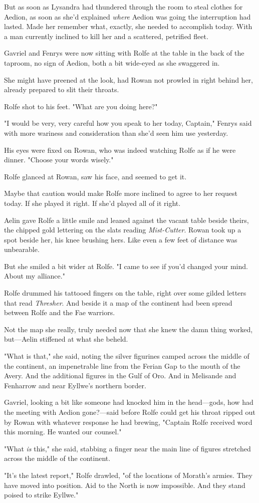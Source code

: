 But as soon as Lysandra had thundered through the room to steal clothes for Aedion, as soon as she'd explained \emph{where} Aedion was going
 the interruption had lasted. Made her remember what, exactly, she needed to accomplish today. With a man currently inclined to kill her and a scattered, petrified fleet.

Gavriel and Fenrys were now sitting with Rolfe at the table in the back of the taproom, no sign of Aedion, both a bit wide-eyed as she swaggered in.

She might have preened at the look, had Rowan not prowled in right behind her, already prepared to slit their throats.

Rolfe shot to his feet. "What are you doing here?"

"I would be very, very careful how you speak to her today, Captain," Fenrys said with more wariness and consideration than she'd seen him use yesterday.

His eyes were fixed on Rowan, who was indeed watching Rolfe as if he were dinner. "Choose your words wisely."

Rolfe glanced at Rowan, saw his face, and seemed to get it.

Maybe that caution would make Rolfe more inclined to agree to her request today. If she played it right. If she'd played all of it right.

Aelin gave Rolfe a little smile and leaned against the vacant table beside theirs, the chipped gold lettering on the slats reading
\emph{Mist-Cutter}. Rowan took up a spot beside her, his knee brushing hers. Like even a few feet of distance was unbearable.

But she smiled a bit wider at Rolfe. "I came to see if you'd changed your mind. About my alliance."

Rolfe drummed his tattooed fingers on the table, right over some gilded letters that read \emph{Thresher}. And beside it  a map of the continent had been spread between Rolfe and the Fae warriors.

Not the map she really, truly needed now that she knew the damn thing worked, but---Aelin stiffened at what she beheld.

"What is that," she said, noting the silver figurines camped across the middle of the continent, an impenetrable line from the Ferian Gap to the mouth of the Avery. And the additional figures in the Gulf of Oro. And in Melisande and Fenharrow and near Eyllwe's northern border.

Gavriel, looking a bit like someone had knocked him in the head---gods, how had the meeting with Aedion gone?---said before Rolfe could get his throat ripped out by Rowan with whatever response he had brewing, "Captain Rolfe received word this morning. He wanted our counsel."

"What \emph{is} this," she said, stabbing a finger near the main line of figures stretched across the middle of the continent.

"It's the latest report," Rolfe drawled, "of the locations of Morath's armies. They have moved into position. Aid to the North is now impossible. And they stand poised to strike Eyllwe."
